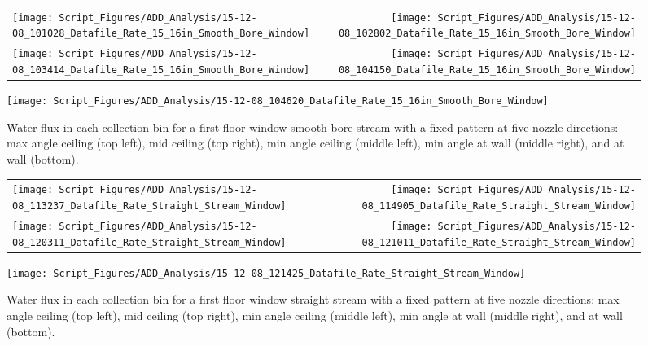\documentclass[12pt,oneside]{book}
\begin{document}
\begin{figure}[ht]
\begin{tabular*}{\textwidth}{lr}
\texttt{[image: Script\_Figures/ADD\_Analysis/15-12-08\_101028\_Datafile\_Rate\_15\_16in\_Smooth\_Bore\_Window]} &
\texttt{[image: Script\_Figures/ADD\_Analysis/15-12-08\_102802\_Datafile\_Rate\_15\_16in\_Smooth\_Bore\_Window]} \\
\texttt{[image: Script\_Figures/ADD\_Analysis/15-12-08\_103414\_Datafile\_Rate\_15\_16in\_Smooth\_Bore\_Window]} &
\texttt{[image: Script\_Figures/ADD\_Analysis/15-12-08\_104150\_Datafile\_Rate\_15\_16in\_Smooth\_Bore\_Window]} \\
\end{tabular*}
\centering
\texttt{[image: Script\_Figures/ADD\_Analysis/15-12-08\_104620\_Datafile\_Rate\_15\_16in\_Smooth\_Bore\_Window]} \\
\caption[Water Flux for Varying Nozzle Direction with Fixed First Floor Window Smooth Bore Stream]{Water flux in each collection bin for a first floor window smooth bore stream with a fixed pattern at five nozzle directions: max angle ceiling (top left), mid ceiling (top right), min angle ceiling (middle left), min angle at wall (middle right), and at wall (bottom).}
\label{fig:Window_First_Floor_Varying_Nozzle_Directions_SB_Fixed_Pattern}
\end{figure}

\begin{figure}[ht]
\begin{tabular*}{\textwidth}{lr}
\texttt{[image: Script\_Figures/ADD\_Analysis/15-12-08\_113237\_Datafile\_Rate\_Straight\_Stream\_Window]} &
\texttt{[image: Script\_Figures/ADD\_Analysis/15-12-08\_114905\_Datafile\_Rate\_Straight\_Stream\_Window]} \\
\texttt{[image: Script\_Figures/ADD\_Analysis/15-12-08\_120311\_Datafile\_Rate\_Straight\_Stream\_Window]} &
\texttt{[image: Script\_Figures/ADD\_Analysis/15-12-08\_121011\_Datafile\_Rate\_Straight\_Stream\_Window]} \\
\end{tabular*}
\centering
\texttt{[image: Script\_Figures/ADD\_Analysis/15-12-08\_121425\_Datafile\_Rate\_Straight\_Stream\_Window]} \\
\caption[Water Flux for Varying Nozzle Direction with Fixed First Floor Window Straight Stream]{Water flux in each collection bin for a first floor window straight stream with a fixed pattern at five nozzle directions: max angle ceiling (top left), mid ceiling (top right), min angle ceiling (middle left), min angle at wall (middle right), and at wall (bottom).}
\label{fig:Window_First_Floor_Varying_Nozzle_Directions_SS_Fixed_Pattern}
\end{figure}
\end{document}
